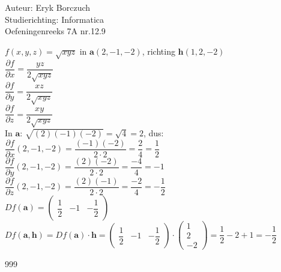 \documentclass[a4paper]{article}
\begin{document}
  
\noindent \large Auteur: Eryk Borczuch \\
\noindent \large Studierichting: Informatica\\
\noindent \large Oefeningenreeks 7A nr.12.9\\

\medskip

\normalsize

$f(x,y,z) = \sqrt{xyz}$ in $\mathbf{a}(2,-1,-2)$, richting $\mathbf{h}(1,2,-2)$ \\
 
$\dfrac{\partial f}{\partial x} = \dfrac{yz}{2 \sqrt{xyz}}$ \\
 
$\dfrac{\partial f}{\partial y} = \dfrac{xz}{2 \sqrt{xyz}}$ \\
 
$\dfrac{\partial f}{\partial z} = \dfrac{xy}{2 \sqrt{xyz}}$ \\
 
In $\mathbf{a}$: $\sqrt{(2)(-1)(-2)} = \sqrt{4} = 2$, dus: \\
 
$\dfrac{\partial f}{\partial x}(2,-1,-2) = \dfrac{(-1)(-2)}{2 \cdot 2} = \dfrac{2}{4} = \dfrac{1}{2}$ \\
 
$\dfrac{\partial f}{\partial y}(2,-1,-2) = \dfrac{(2)(-2)}{2 \cdot 2} = \dfrac{-4}{4} = -1$ \\
 
$\dfrac{\partial f}{\partial z}(2,-1,-2) = \dfrac{(2)(-1)}{2 \cdot 2} = \dfrac{-2}{4} = - \dfrac{1}{2}$ \\
 
$Df(\mathbf{a}) = \begin{pmatrix} \dfrac{1}{2} & -1 & - \dfrac{1}{2} \end{pmatrix}$ \\
 
$Df(\mathbf{a},\mathbf{h}) = Df(\mathbf{a}) \cdot \mathbf{h} = \begin{pmatrix} \dfrac{1}{2} & -1 & - \dfrac{1}{2} \end{pmatrix} \cdot \begin{pmatrix} 1 \\ 2 \\ -2 \end{pmatrix} = \dfrac{1}{2} - 2 + 1 = - \dfrac{1}{2}$ \\


\begin{thebibliography}{999}
\end{thebibliography}
\end{document}
